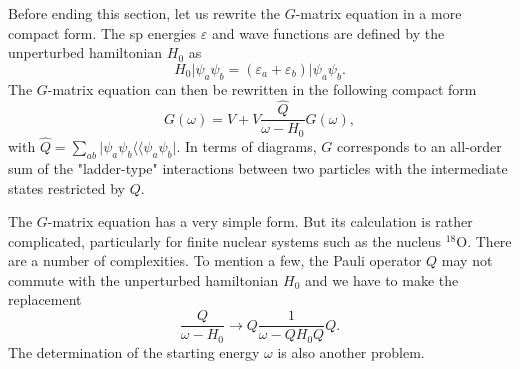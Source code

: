 Before ending this section, let us rewrite the $G$-matrix equation
in a more compact form.
The sp energies $\varepsilon$ and wave functions are defined
by the unperturbed hamiltonian $H_0$ as
\begin{equation}
   H_0\vert \psi_a\psi_b=(\varepsilon_a+\varepsilon_b)
   \vert \psi_a\psi_b.
\end{equation}
The $G$-matrix equation can then be rewritten in the following
compact form
\begin{equation}
   G(\omega )=V+V\frac{\hat{Q}}{\omega -H_0}G(\omega ),
\end{equation}
with
$\hat{Q}=\sum_{ab}\vert \psi_a\psi_b\langle\langle \psi_a\psi_b\vert$.
In terms of diagrams, $G$ corresponds to an all-order sum of the
"ladder-type" interactions between two particles with the
intermediate states restricted by $Q$.

The $G$-matrix equation has a very simple form. But its
calculation is rather complicated, particularly for finite
nuclear systems such as the nucleus $^{18}$O. There are a
number of complexities. To mention a few, the Pauli operator
$Q$ may not commute with the unperturbed hamiltonian
$H_0$ and we have to make the replacement
\[
\frac{Q}{\omega -H_0}\rightarrow Q\frac{1}{\omega -QH_0Q}Q.
\]
The determination of the starting energy $\omega$ is also another
problem. 


